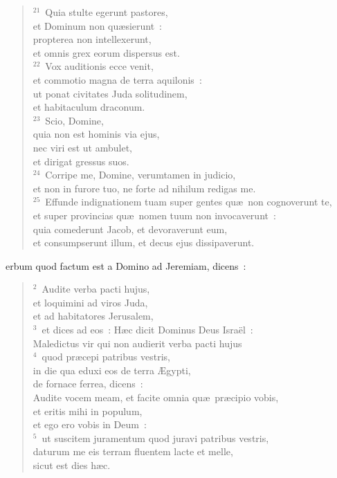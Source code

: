 \begin{verse}
${}^{21}$~Quia stulte egerunt pastores,\\ et Dominum non qu\ae sierunt~:\\ propterea non intellexerunt,\\ et omnis grex eorum dispersus est.\\
${}^{22}$~Vox auditionis ecce venit,\\ et commotio magna de terra aquilonis~:\\ ut ponat civitates Juda solitudinem,\\ et habitaculum draconum.\\
${}^{23}$~Scio, Domine,\\ quia non est hominis via ejus,\\ nec viri est ut ambulet,\\ et dirigat gressus suos.\\
${}^{24}$~Corripe me, Domine, verumtamen in judicio,\\ et non in furore tuo, ne forte ad nihilum redigas me.\\
${}^{25}$~Effunde indignationem tuam super gentes qu\ae\ non cognoverunt te,\\ et super provincias qu\ae\ nomen tuum non invocaverunt~:\\ quia comederunt Jacob, et devoraverunt eum,\\ et consumpserunt illum, et decus ejus dissipaverunt.\end{verse}



\bchapter
{}erbum quod factum est a Domino ad Jeremiam, dicens~:
\begin{verse}${}^{2}$~Audite verba pacti hujus,\\ et loquimini ad viros Juda,\\ et ad habitatores Jerusalem,\\
${}^{3}$~et dices ad eos~: H\ae c dicit Dominus Deus Isra\"el~:\\ Maledictus vir qui non audierit verba pacti hujus\\
${}^{4}$~quod pr\ae cepi patribus vestris,\\ in die qua eduxi eos de terra \AE gypti,\\ de fornace ferrea, dicens~:\\ Audite vocem meam, et facite omnia qu\ae\ pr\ae cipio vobis,\\ et eritis mihi in populum,\\ et ego ero vobis in Deum~:\\
${}^{5}$~ut suscitem juramentum quod juravi patribus vestris,\\ daturum me eis terram fluentem lacte et melle,\\ sicut est dies h\ae c.\end{verse}

